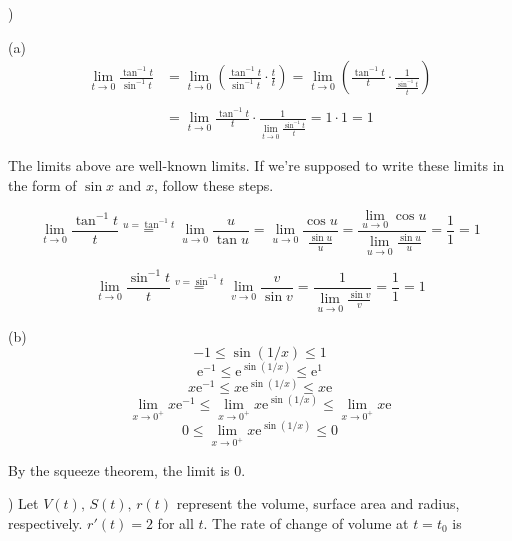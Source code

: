 \documentclass{article}
\begin{document}
)

\hfill

\noindent (a)
\begin{align*}
\lim_{t\to 0} \frac{\tan^{-1} t}{\sin^{-1} t}&= \lim_{t\to 0}\left( \frac{\tan^{-1} t}{\sin^{-1}t} \cdot\frac tt\right) = \lim_{t\to 0}\left( \frac{\tan^{-1} t}{t} \cdot\frac1{\frac {\sin^{-1}t}t}\right)\\\\&=\lim_{t\to0}\frac{\tan^{-1}t}t\cdot\frac1{\displaystyle\lim_{t\to 0}\frac{\sin^{-1}t}t}=1\cdot1=\boxed1
\end{align*}

\noindent The limits above are well-known limits. If we're supposed to write these limits in the form of $\sin x$ and $x$, follow these steps.

\[\lim_{t\to0}\frac{\tan^{-1} t}{t}\overset{u=\tan^{-1} t}{=}\lim_{u\to0}\frac u{\tan u} = \lim_{u\to0}\frac{\cos u}{\frac{\sin u}u}=\frac{\displaystyle \lim_{u\to0}\cos u}{\displaystyle\lim_{u\to0}\frac{\sin u}u} = \frac11 = 1\]

\[\lim_{t\to0}\frac{\sin^{-1} t}{t}\overset{v=\sin^{-1} t}{=}\lim_{v\to0}\frac v{\sin v} =\frac1{\displaystyle\lim_{u\to0}\frac{\sin v}v} = \frac11 = 1\]

\hfill

\noindent (b)
\begin{equation*}-1\leq\sin(1/x) \leq 1\end{equation*}
\begin{equation*}\mathrm{e}^{-1}\leq\mathrm{e}^{\sin(1/x)} \leq \mathrm{e}^1\end{equation*}
\begin{equation*}x\mathrm{e}^{-1}\leq x\mathrm{e}^{\sin(1/x)} \leq x\mathrm{e}\end{equation*}
\begin{equation*}\lim_{x\to0^+}x\mathrm{e}^{-1}\leq \lim_{x\to0^+}x\mathrm{e}^{\sin(1/x)} \leq\lim_{x\to0^+}x\mathrm{e}\end{equation*}
\begin{equation*}0\leq \lim_{x\to0^+}x\mathrm{e}^{\sin(1/x)} \leq0\end{equation*}

\hfill

\noindent By the squeeze theorem, the limit is $\boxed{0}$.

\hfill

) Let $V(t),\,S(t),\,r(t)$ represent the volume, surface area and radius, respectively. $r'(t) = 2$ for all $t$. The rate of change of volume at $t=t_0$ is
\end{document}
